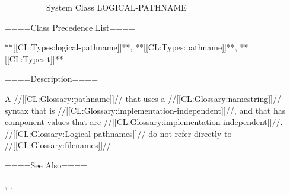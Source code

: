 ====== System Class LOGICAL-PATHNAME ======

====Class Precedence List====

**[[CL:Types:logical-pathname]]**, **[[CL:Types:pathname]]**, **[[CL:Types:t]]**

====Description====

A //[[CL:Glossary:pathname]]// that uses a //[[CL:Glossary:namestring]]// syntax that is //[[CL:Glossary:implementation-independent]]//, and that has component values that are //[[CL:Glossary:implementation-independent]]//. //[[CL:Glossary:Logical pathnames]]// do not refer directly to //[[CL:Glossary:filenames]]//

====See Also====

{\secref\FileSystemConcepts}, {\secref\SharpsignP}, {\secref\PrintingPathnames}

